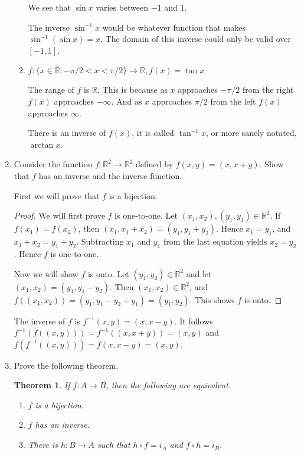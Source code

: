 \documentclass[12pt]{article}
\newtheorem{theorem}{Theorem}
\begin{document}
\begin{enumerate}
\begin{enumerate}
			We see that $\sin{x}$ varies between $-1$ and $1$.
			
			The inverse $\sin^{-1}{x}$ would be whatever function that makes $\sin^{-1}{(\sin{x})}=x$. The domain of this inverse could only be valid over $[-1,1]$.
			
			\newpage
			
			\item $f:\{x\in\mathbb{R}:-\pi/2<x<\pi/2 \}\to\mathbb{R},f(x)=\tan{x}$
			
			The range of $f$ is $\mathbb{R}$. This is because as $x$ approaches $-\pi/2$ from the right $f(x)$ approaches $-\infty$. And as $x$ approaches $\pi/2$ from the left $f(x)$ approaches $\infty$.
			
			There is an inverse of $f(x)$, it is called $\tan^{-1}{x}$, or more sanely notated, $\arctan{x}$. 
		\end{enumerate}
	
	\item Consider the function $f:\mathbb{R}^2\to\mathbb{R}^2$ defined by $f(x,y)=(x,x+y)$. Show that $f$ has an inverse and the inverse function.
	
	First we will prove that $f$ is a bijection.
	\nolinebreak
	\begin{proof}
		We will first prove $f$ is one-to-one. Let $(x_1,x_2),(y_1,y_2)\in\mathbb{R}^2$. If $f(x_1)=f(x_2)$, then $(x_1,x_1+x_2)=(y_1,y_1+y_2)$. Hence $x_1=y_1$, and $x_1+x_2=y_1+y_2$. Subtracting $x_1$ and $y_1$ from the last equation yields $x_2=y_2$. Hence $f$ is one-to-one.
		
		Now we will show $f$ is onto. Let $(y_1,y_2)\in\mathbb{R}^2$ and let $(x_1,x_2)=(y_1,y_1-y_2)$. Then $(x_1,x_2)\in\mathbb{R}^2$, and $f((x_1,x_2))=(y_1,y_1-y_2+y_1)=(y_1,y_2)$. This shows $f$ is onto.
	\end{proof}

	The inverse of $f$ is $f^{-1}(x,y)=(x,x-y)$. It follows $f^{-1}(f((x,y)))=f^{-1}((x,x+y))=(x,y)$ and $f(f^{-1}((x,y)))=f(x,x-y)=(x,y)$.
	
	\item Prove the following theorem.
	
	\begin{theorem}
		If $f:A\to B$, then the following are equivalent.
		\begin{enumerate}
			\item $f$ is a bijection.
			\item $f$ has an inverse.
			\item There is $h:B\to A$ such that $h\circ f=i_A$ and $f\circ h=i_B$.
		\end{enumerate}
	\end{theorem}


\end{enumerate}
\end{document}
